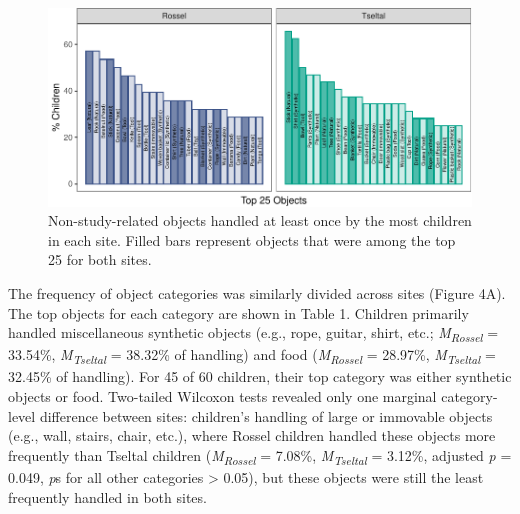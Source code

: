 \documentclass[10pt, letterpaper]{article}
\newenvironment{CodeChunk}{}{}
\begin{document}
\begin{CodeChunk}
\begin{figure}[!ht]

{\centering \includegraphics{figs/top-objects-fig-1} 

}

\caption[Non-study-related objects handled at least once by the most children in each site]{Non-study-related objects handled at least once by the most children in each site. Filled bars represent objects that were among the top 25 for both sites.}\label{fig:top-objects-fig}
\end{figure}
\end{CodeChunk}

The frequency of object categories was similarly divided across sites
(Figure 4A). The top objects for each category are shown in Table 1.
Children primarily handled miscellaneous synthetic objects (e.g., rope,
guitar, shirt, etc.; \emph{M}\textsubscript{\emph{Rossel}} = 33.54\%,
\emph{M}\textsubscript{\emph{Tseltal}} = 38.32\% of handling) and food
(\emph{M}\textsubscript{\emph{Rossel}} = 28.97\%,
\emph{M}\textsubscript{\emph{Tseltal}} = 32.45\% of handling). For 45 of
60 children, their top category was either synthetic objects or food.
Two-tailed Wilcoxon tests revealed only one marginal category-level
difference between sites: children's handling of large or immovable
objects (e.g., wall, stairs, chair, etc.), where Rossel children handled
these objects more frequently than Tseltal children
(\emph{M}\textsubscript{\emph{Rossel}} = 7.08\%,
\emph{M}\textsubscript{\emph{Tseltal}} = 3.12\%, adjusted \emph{p} =
0.049, \emph{p}s for all other categories \textgreater{} 0.05), but
these objects were still the least frequently handled in both sites.
\end{document}
